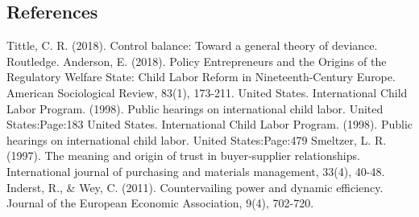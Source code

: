 \documentclass[a4paper, 11pt, margin=1in]{article}
\begin{document}
\subsection{References}
\begin{thebibliography}{9}
    Tittle, C. R. (2018). Control balance: Toward a general theory of deviance. Routledge.
    Anderson, E. (2018). Policy Entrepreneurs and the Origins of the Regulatory Welfare State: Child Labor Reform in Nineteenth-Century Europe. American Sociological Review, 83(1), 173-211.
    United States. International Child Labor Program. (1998). Public hearings on international child labor. United States:Page:183
    United States. International Child Labor Program. (1998). Public hearings on international child labor. United States:Page:479
    Smeltzer, L. R. (1997). The meaning and origin of trust in buyer‐supplier relationships. International journal of purchasing and materials management, 33(4), 40-48.
    Inderst, R., \& Wey, C. (2011). Countervailing power and dynamic efficiency. Journal of the European Economic Association, 9(4), 702-720.
\end{thebibliography}
\end{document}
